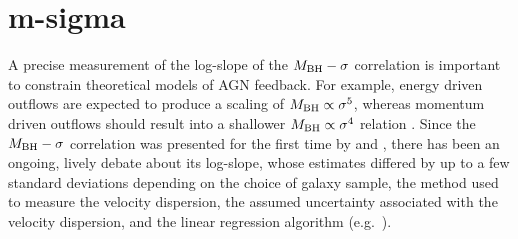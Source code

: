 \chapter{m-sigma}
\label{ch:msigma}

A precise measurement of the log-slope of the $M_{\rm BH} - \sigma$ correlation is important 
to constrain theoretical models of AGN feedback. 
For example, energy driven outflows are expected to produce a scaling of $M_{\rm BH} \propto \sigma^5$, 
whereas momentum driven outflows should result into a shallower $M_{\rm BH} \propto \sigma^4$ relation 
\citep{silkrees1998,fabian1999}. 
Since the $M_{\rm BH} - \sigma$ correlation was presented for the first time by \citet{ferraresemerritt2000}
and \citet{gebhardt2000}, 
there has been an ongoing, lively debate about its log-slope, 
whose estimates differed by up to a few standard deviations 
depending on the choice of galaxy sample, the method used to measure the velocity dispersion,
the assumed uncertainty associated with the velocity dispersion, 
and the linear regression algorithm (e.g.~\citealt{tremaine2002}). \\ 

